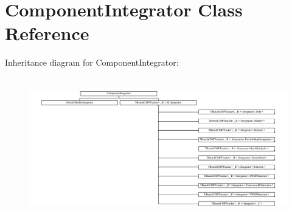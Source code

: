 \hypertarget{classComponentIntegrator}{}\section{Component\+Integrator Class Reference}
\label{classComponentIntegrator}
Inheritance diagram for Component\+Integrator\+:\begin{figure}[H]
\begin{center}
\leavevmode
\includegraphics[height=6.222222cm]{classComponentIntegrator}
\end{center}
\end{figure}
